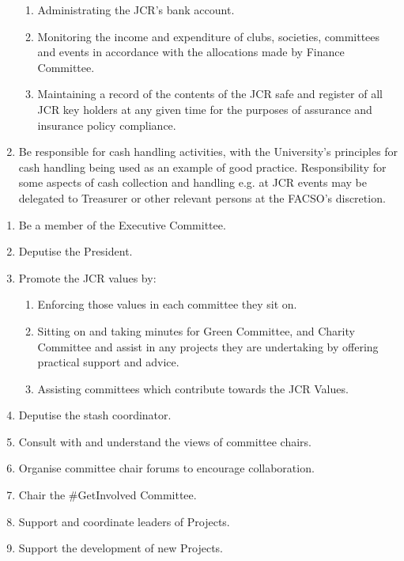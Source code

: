 \begin{enumerate}
\begin{enumerate}
            \item Administrating the JCR’s bank account.
            \item Monitoring the income and expenditure of clubs, societies, committees and events in accordance with the allocations made by Finance Committee.
            \item Maintaining a record of the contents of the JCR safe and register of all JCR key holders at any given time for the purposes of assurance and insurance policy compliance.
        \end{enumerate}
    \item Be responsible for cash handling activities, with the University’s principles for cash handling being used as an example of good practice. Responsibility for some aspects of cash collection and handling e.g. at JCR events may be delegated to Treasurer or other relevant persons at the FACSO’s discretion. 
\end{enumerate}

\begin{enumerate}
    \item Be a member of the Executive Committee.
    \item Deputise the President. 
    \item Promote the JCR values by: 
        \begin{enumerate}
            \item Enforcing those values in each committee they sit on. 
            \item Sitting on and taking minutes for Green Committee, and Charity Committee and assist in any projects they are undertaking by offering practical support and advice. 
            \item Assisting committees which contribute towards the JCR Values. 
        \end{enumerate}
    \item Deputise the stash coordinator. 
    \item Consult with and understand the views of committee chairs. 
    \item Organise committee chair forums to encourage collaboration. 
    \item Chair the \#GetInvolved Committee.
    \item Support and coordinate leaders of Projects. 
    \item Support the development of new Projects. 
\end{enumerate}

